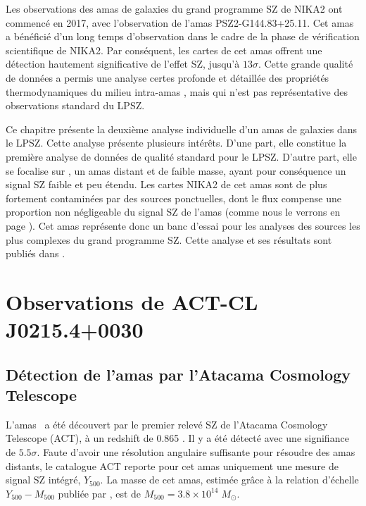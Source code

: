 Les observations des amas de galaxies du grand programme SZ de NIKA2 ont commencé en 2017, avec l'observation de l'amas PSZ2-G144.83+25.11.
Cet amas a bénéficié d'un long temps d'observation dans le cadre de la phase de vérification scientifique de NIKA2.
Par conséquent, les cartes de cet amas offrent une détection hautement significative de l'effet SZ, jusqu'à $13\sigma$.
Cette grande qualité de données a permis une analyse certes profonde et détaillée des propriétés thermodynamiques du milieu intra-amas \cite{ruppin_first_2018}, mais qui n'est pas représentative des observations standard du LPSZ.

Ce chapitre présente la deuxième analyse individuelle d'un amas de galaxies dans le LPSZ.
Cette analyse présente plusieurs intérêts.
D'une part, elle constitue la première analyse de données de qualité standard pour le LPSZ.
D'autre part, elle se focalise sur \act, un amas distant et de faible masse, ayant pour conséquence un signal SZ faible et peu étendu.
Les cartes NIKA2 de cet amas sont de plus fortement contaminées par des sources ponctuelles, dont le flux compense une proportion non négligeable du signal SZ de l'amas (comme nous le verrons en page \pageref{sec:act:ps}).
Cet amas représente donc un banc d'essai pour les analyses des sources les plus complexes du grand programme SZ.
Cette analyse et ses résultats sont publiés dans .

\section{Observations de ACT-CL J0215.4+0030}

\subsection{Détection de l'amas par l'Atacama Cosmology Telescope}\label{subsec:act:act}

L'amas \act\ a été découvert par le premier relevé SZ de l'Atacama Cosmology Telescope (ACT), à un redshift de 0.865 \cite{menanteau_atacama_2013,hasselfield_atacama_2013}.
Il y a été détecté avec une signifiance de $5.5\sigma$.
Faute d'avoir une résolution angulaire suffisante pour résoudre des amas distants, le catalogue ACT reporte pour cet amas uniquement une mesure de signal SZ intégré, $Y_{500}$.
La masse de cet amas, estimée grâce à la relation d'échelle $Y_{500} - M_{500}$ publiée par , est de $M_{500} = 3.8 \times 10^{14} \; M_\odot$.

